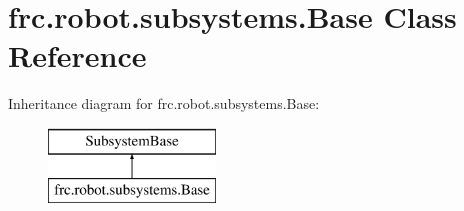 \hypertarget{classfrc_1_1robot_1_1subsystems_1_1_base}{}\section{frc.\+robot.\+subsystems.\+Base Class Reference}
\label{classfrc_1_1robot_1_1subsystems_1_1_base}
Inheritance diagram for frc.\+robot.\+subsystems.\+Base\+:\begin{figure}[H]
\begin{center}
\leavevmode
\includegraphics[height=2.000000cm]{classfrc_1_1robot_1_1subsystems_1_1_base}
\end{center}
\end{figure}
